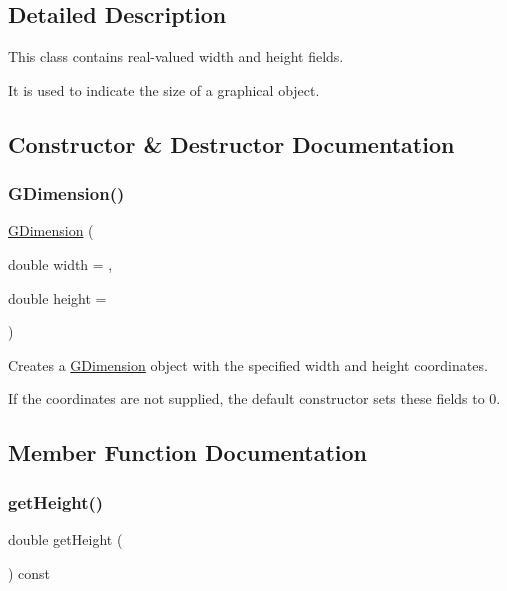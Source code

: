 \subsection{Detailed Description}
This class contains real-\/valued width and height fields. 

It is used to indicate the size of a graphical object. 

\subsection{Constructor \& Destructor Documentation}
\mbox{\label{classGDimension_a6b8171acdd56ca62c8bea0f73bd27ea7}} 
\subsubsection{\texorpdfstring{G\+Dimension()}{GDimension()}}
{\footnotesize\ttfamily \mbox{\hyperlink{classGDimension}{G\+Dimension}} (\begin{DoxyParamCaption}\item[{double}]{width = {},  }\item[{double}]{height = {} }\end{DoxyParamCaption})}



Creates a {\ttfamily \mbox{\hyperlink{classGDimension}{G\+Dimension}}} object with the specified {\ttfamily width} and {\ttfamily height} coordinates. 

If the coordinates are not supplied, the default constructor sets these fields to 0. 

\subsection{Member Function Documentation}
\mbox{\label{classGDimension_a1e7e353362434072875264cf95629f99}} 
\subsubsection{\texorpdfstring{get\+Height()}{getHeight()}}
{\footnotesize\ttfamily double get\+Height (\begin{DoxyParamCaption}{ }\end{DoxyParamCaption}) const}



